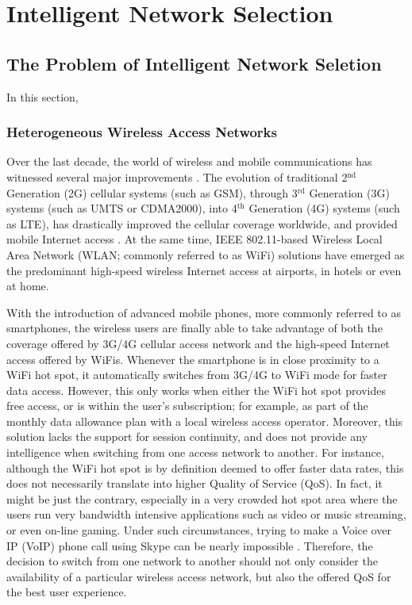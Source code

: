 \chapter{Intelligent Network Selection} %
\label{cha:intelligent}

\minitoc
\vspace{10mm}

\section{The Problem of Intelligent Network Seletion} %
\label{sec:the_problem_of_intelligent_network_seletion_intelligent}
In this section, 

\subsection{Heterogeneous Wireless Access Networks} %
\label{sub:heterogeneous_wireless_access_networks_intelligent}
Over the last decade, the world of wireless and mobile communications has witnessed several major improvements \cite{ABC03}. The evolution of traditional 2$^\text{nd}$ Generation (2G) cellular systems (such as GSM), through 3$^{\text{rd}}$ Generation (3G) systems (such as UMTS or CDMA2000), into 4$^{\text{th}}$ Generation (4G) systems (such as LTE), has drastically improved the cellular coverage worldwide, and provided mobile Internet access \cite{HossainBeaubrun09, HossainTalebiFard09}. At the same time, IEEE 802.11-based Wireless Local Area Network (WLAN; commonly referred to as WiFi) solutions have emerged as the predominant high-speed wireless Internet access at airports, in hotels or even at home.

With the introduction of advanced mobile phones, more commonly referred to as smartphones, the wireless users are finally able to take advantage of both the coverage offered by 3G/4G cellular access network and the high-speed Internet access offered by WiFis. Whenever the smartphone is in close proximity to a WiFi hot spot, it automatically switches from 3G/4G to WiFi mode for faster data access. However, this only works when either the WiFi hot spot provides free access, or is within the user's subscription; for example, as part of the monthly data allowance plan with a local wireless access operator. Moreover, this solution lacks the support for session continuity, and does not provide any intelligence when switching from one access network to another. For instance, although the WiFi hot spot is by definition deemed to offer faster data rates, this does not necessarily translate into higher Quality of Service (QoS). In fact, it might be just the contrary, especially in a very crowded hot spot area where the users run very bandwidth intensive applications such as video or music streaming, or even on-line gaming. Under such circumstances, trying to make a Voice over IP (VoIP) phone call using Skype can be nearly impossible \cite{Wisely4gWLAN09}. Therefore, the decision to switch from one network to another should not only consider the availability of a particular wireless access network, but also the offered QoS for the best user experience.

